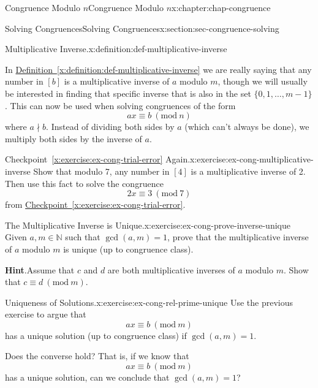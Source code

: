 \documentclass[oneside,10pt,]{book}
\newcommand{\blocktitlefont}{\relax}
\newcommand{\xreffont}{\relax}
\numberwithin{equation}{section}
\newcommand{\Mod}[1]{\ \left(\mathrm{mod}\ #1\right)}
\begin{document}
\begin{chapterptx}{Congruence Modulo \(n\)}{}{Congruence Modulo \(n\)}{}{}{x:chapter:chap-congruence}
\begin{sectionptx}{Solving Congruences}{}{Solving Congruences}{}{}{x:section:sec-congruence-solving}
\begin{definition}{Multiplicative Inverse.}{x:definition:def-multiplicative-inverse}
\end{definition}
In \hyperref[x:definition:def-multiplicative-inverse]{Definition~{\xreffont\ref{x:definition:def-multiplicative-inverse}}} we are really saying that any number in \([b]\) is a multiplicative inverse of \(a\) modulo \(m\), though we will usually be interested in finding that specific inverse that is also in the set \(\{0,1,\ldots,m-1\}\). This can now be used when solving congruences of the form%
\begin{equation*}
ax \equiv b \Mod{n}
\end{equation*}
where \(a \nmid b\). Instead of dividing both sides by \(a\) (which can't always be done), we multiply both sides by the inverse of \(a\).%
\begin{inlineexercise}{Checkpoint~{\xreffont\ref*{x:exercise:ex-cong-trial-error}} Again.}{x:exercise:ex-cong-multiplicative-inverse}%
Show that modulo 7, any number in \([4]\) is a multiplicative inverse of 2. Then use this fact to solve the congruence%
\begin{equation*}
2x \equiv 3 \Mod{7}
\end{equation*}
from \hyperref[x:exercise:ex-cong-trial-error]{Checkpoint~{\xreffont\ref{x:exercise:ex-cong-trial-error}}}.%
\end{inlineexercise}
\begin{inlineexercise}{The Multiplicative Inverse is Unique.}{x:exercise:ex-cong-prove-inverse-unique}%
Given \(a, m \in \mathbb{N}\) such that \(\gcd(a,m) = 1\), prove that the multiplicative inverse of \(a\) modulo \(m\) is unique (up to congruence class).%
\par\smallskip%
\noindent\textbf{\blocktitlefont Hint}.\hypertarget{g:hint:id443587}{}\quad{}Assume that \(c\) and \(d\) are both multiplicative inverses of \(a\) modulo \(m\). Show that \(c \equiv d \Mod{m}\).%
\end{inlineexercise}
\begin{inlineexercise}{Uniqueness of Solutions.}{x:exercise:ex-cong-rel-prime-unique}%
Use the previous exercise to argue that%
\begin{equation*}
ax \equiv b \Mod{m}
\end{equation*}
has a unique solution (up to congruence class) if \(\gcd(a,m) = 1\).%
\par
Does the converse hold? That is, if we know that%
\begin{equation*}
ax \equiv b \Mod{m}
\end{equation*}
has a unique solution, can we conclude that \(\gcd(a,m) = 1\)?%

\end{inlineexercise}
\end{sectionptx}
\end{chapterptx}
\end{document}
